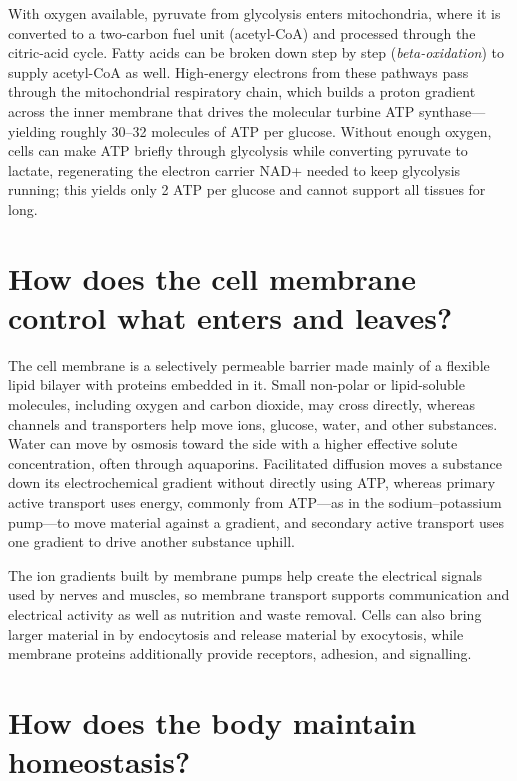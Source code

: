 \documentclass[11pt,oneside]{report}
\begin{document}
With oxygen available, pyruvate from glycolysis enters mitochondria, where it
is converted to a two-carbon fuel unit (acetyl-CoA) and processed through the
citric-acid cycle. Fatty acids can be broken down step by step
(\emph{beta-oxidation}) to supply acetyl-CoA as well. High-energy electrons from
these pathways pass through the mitochondrial respiratory chain, which builds a
proton gradient across the inner membrane that drives the molecular turbine
ATP synthase—yielding roughly 30--32 molecules of ATP per glucose. Without
enough oxygen, cells can make ATP briefly through glycolysis while converting
pyruvate to lactate, regenerating the electron carrier NAD+ needed to keep
glycolysis running; this yields only 2 ATP per glucose and cannot support all
tissues for long.

\section{How does the cell membrane control what enters and leaves?}

The cell membrane is a selectively permeable barrier made mainly of a flexible
lipid bilayer with proteins embedded in it. Small non-polar or lipid-soluble
molecules, including oxygen and carbon dioxide, may cross directly, whereas
channels and transporters help move ions, glucose, water, and other substances.
Water can move by osmosis toward the side with a higher effective solute
concentration, often through aquaporins. Facilitated diffusion moves a
substance down its electrochemical gradient without directly using ATP, whereas
primary active transport uses energy, commonly from ATP---as in the
sodium--potassium pump---to move material against a gradient, and secondary
active transport uses one gradient to drive another substance uphill.

The ion gradients built by membrane pumps help create the electrical signals
used by nerves and muscles, so membrane transport supports communication and
electrical activity as well as nutrition and waste removal. Cells can also bring
larger material in by endocytosis and release material by exocytosis, while
membrane proteins additionally provide receptors, adhesion, and signalling.

\section{How does the body maintain homeostasis?}
\end{document}
